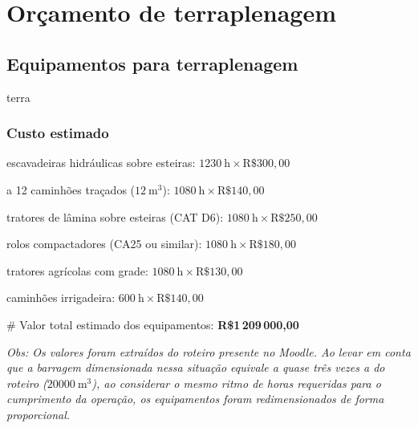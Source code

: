 \documentclass[a4paper, 12pt, brazilian]{article}
\begin{document}
	\newpage
	
	\section{Orçamento de terraplenagem}
	
	\subsection{Equipamentos para terraplenagem}
	
	{terra}
	
	\subsubsection{Custo estimado}
	
	 escavadeiras hidráulicas sobre esteiras: $\SI{1230}{\hour}\times\textrm{R\$}300,00$
	
	 a 12 caminhões traçados ($\SI{12}{\meter^{3}}$): $\SI{1080}{\hour}\times\textrm{R\$}140,00$
	
	 tratores de lâmina sobre esteiras (CAT D6): $\SI{1080}{\hour}\times\textrm{R\$}250,00$
	
	 rolos compactadores (CA25 ou similar):  $\SI{1080}{\hour}\times\textrm{R\$}180,00$
	
	 tratores agrícolas com grade: $\SI{1080}{\hour}\times\textrm{R\$}130,00$
	
	 caminhões irrigadeira:  $\SI{600}{\hour}\times\textrm{R\$}140,00$
	
	\# Valor total estimado dos equipamentos: \textbf{R\$1\,209\,000,00}
	\vspace{1cm}

	\small{\textit{Obs: Os valores foram extraídos do roteiro presente no Moodle. Ao levar em conta que a barragem dimensionada nessa situação equivale a quase três vezes a do roteiro \textrm{($\SI{20000}{\meter^{3}}$)}, ao considerar o mesmo ritmo de horas requeridas para o cumprimento da operação, os equipamentos foram redimensionados de forma proporcional.}}
	
\end{document}

